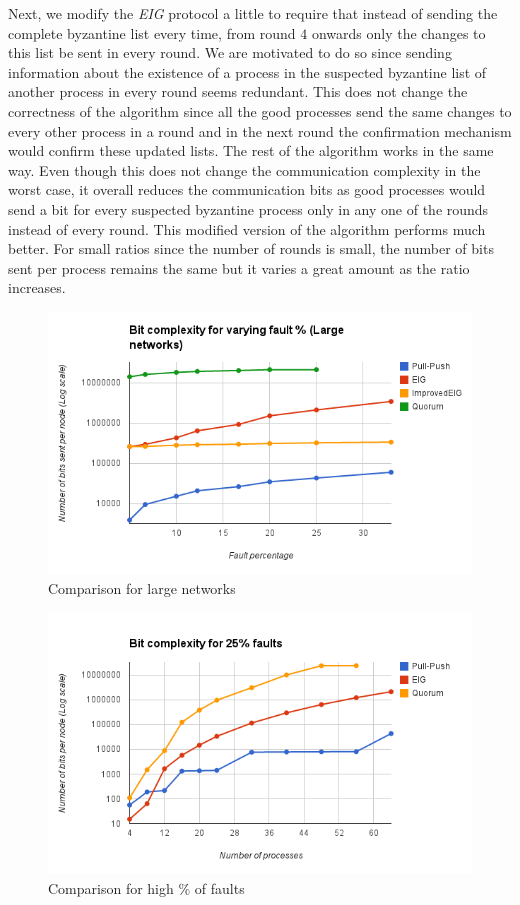Next, we modify the \textit{EIG} protocol a little to require that instead of sending the complete byzantine list every time, from round $4$ onwards only the changes to this list be sent in every round. We are motivated to do so since sending information about the existence of a process in the suspected byzantine list of another process in every round seems redundant. This does not change the correctness of the algorithm since all the good processes send the same changes to every other process in a round and in the next round the confirmation mechanism would confirm these updated lists. The rest of the algorithm works in the same way. Even though this does not change the communication complexity in the worst case, it overall reduces the communication bits as good processes would send a bit for every suspected byzantine process only in any one of the rounds instead of every round. This modified version of the algorithm performs much better. For small ratios since the number of rounds is small, the number of bits sent per process remains the same but it varies a great amount as the ratio increases.
\begin{figure}[ht]
 \centering
\includegraphics[scale=0.4]{LargeNetBit}
\caption{Comparison for large networks}
 \label{fig:comp}
\end{figure}

\begin{figure}[ht]
 \centering
\includegraphics[scale=0.4]{Fault25}
\caption{Comparison for high \% of faults}
 \label{fig:fault25}
\end{figure}

